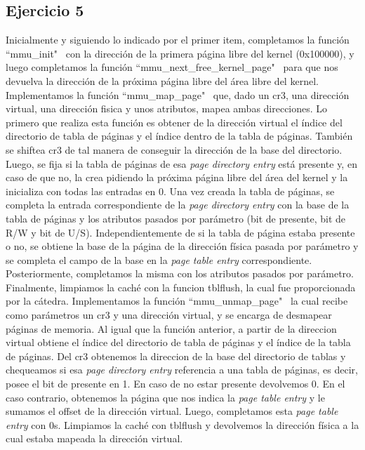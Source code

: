 \documentclass[a4paper]{article}
\begin{document}
\subsection{Ejercicio 5}
\justify
Inicialmente y siguiendo lo indicado por el primer item, completamos la función ``mmu_init" \ con la dirección de la primera página libre del kernel (0x100000), y luego completamos la función ``mmu_next_free_kernel_page" \ para que nos devuelva la dirección de la próxima página libre del área libre del kernel.
\justify
Implementamos la función ``mmu_map_page" \ que, dado un cr3, una dirección virtual, una dirección fisica y unos atributos, mapea ambas direcciones. Lo primero que realiza esta función es obtener de la dirección virtual el índice del directorio de tabla de páginas y el índice dentro de la tabla de páginas. También se shiftea cr3 de tal manera de conseguir la dirección de la base del directorio. Luego, se fija si la tabla de páginas de esa \textit{page directory entry} está presente y, en caso de que no, la crea pidiendo la próxima página libre del área del kernel y la inicializa con todas las entradas en 0. Una vez creada la tabla de páginas, se completa la entrada correspondiente de la \textit{page directory entry} con la base de la tabla de páginas y los atributos pasados por parámetro (bit de presente, bit de R/W y bit de U/S). Independientemente de si la tabla de página estaba presente o no, se obtiene la base de la página de la dirección física pasada por parámetro y se completa el campo de la base en la \textit{page table entry} correspondiente. Posteriormente, completamos la misma con los atributos pasados por parámetro. Finalmente, limpiamos la caché con la funcion tblflush, la cual fue proporcionada por la cátedra.
\justify
Implementamos la función ``mmu_unmap_page" \, la cual recibe como parámetros un cr3 y una dirección virtual, y se encarga de desmapear páginas de memoria. Al igual que la función anterior, a partir de la direccion virtual obtiene el índice del directorio de tabla de páginas y el índice de la tabla de páginas. Del cr3 obtenemos la direccion de la base del directorio de tablas y chequeamos si esa \textit{page directory entry} referencia a una tabla de páginas, es decir, posee el bit de presente en 1. En caso de no estar presente devolvemos 0. En el caso contrario, obtenemos la página que nos indica la \textit{page table entry} y le sumamos el offset de la dirección virtual. Luego, completamos esta \textit{page table entry} con 0s. Limpiamos la caché con tblflush y devolvemos la dirección física a la cual estaba mapeada la dirección virtual.
\end{document}
